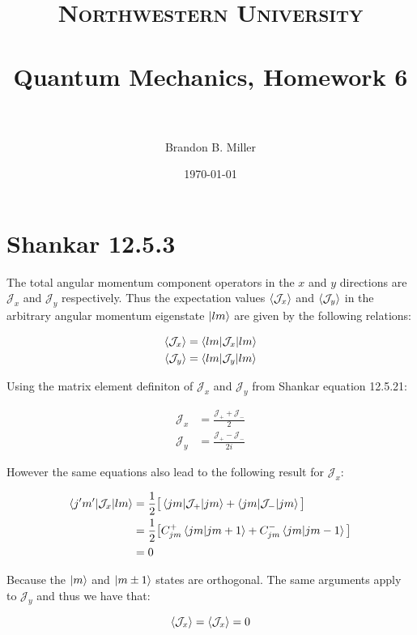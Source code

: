 \documentclass[paper=a4, fontsize=11pt]{scrartcl} %
\title{	
\normalfont \normalsize 
\textsc{Northwestern University} \\ [25pt] %
\horrule{0.5pt} \\[0.4cm] %
\huge Quantum Mechanics, Homework 6 \\ %
\horrule{2pt} \\[0.5cm] %
}
\author{Brandon B. Miller} %
\date{\normalsize\today} %
\numberwithin{equation}{section} %
\numberwithin{figure}{section} %
\numberwithin{table}{section} %
\begin{document}
\maketitle %


\section{Shankar 12.5.3}

The total angular momentum component operators in the $x$ and $y$ directions are $\mathcal{J}_x$ and $\mathcal{J}_y$ respectively. Thus the expectation values $\braket{\mathcal{J}_x}$ and $\braket{\mathcal{J}_y}$ in the arbitrary angular momentum eigenstate $\ket{lm}$ are given by the following relations:

\begin{align}
\braket{\mathcal{J}_x} &= \braket{lm|\mathcal{J}_x|lm} \\
\braket{\mathcal{J}_y} &= \braket{lm|\mathcal{J}_y|lm}
\end{align} 

Using the matrix element definiton of $\mathcal{J}_x$ and $\mathcal{J}_y$ from Shankar equation 12.5.21:

\begin{align}
\mathcal{J}_x &= \frac{\mathcal{J}_+ + \mathcal{J}_-}{2} \\
\mathcal{J}_y &= \frac{\mathcal{J}_+ - \mathcal{J}_-}{2i}
\end{align}

However the same equations also lead to the following result for $\mathcal{J}_x$:

\begin{align}
\braket{j'm'|\mathcal{J}_x|lm} &= \frac{1}{2} \big[\braket{jm|\mathcal{J}_+|jm} + \braket{jm|\mathcal{J}_-|jm} \big] \\
&= \frac{1}{2} \big[ C^+_{jm} \braket{jm|jm+1} + C^-_{jm} \braket{jm|jm-1} \big] \\
&= 0 
\end{align}

Because the $\ket{m}$ and $\ket{m \pm 1}$ states are orthogonal. The same arguments apply to $\mathcal{J}_y$ and thus we have that:

\begin{equation}
\braket{\mathcal{J}_x} = \braket{\mathcal{J}_x} = 0
\end{equation}
\end{document}
